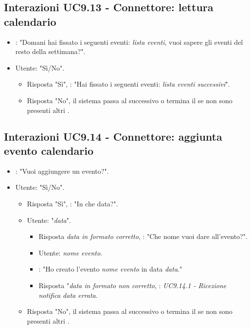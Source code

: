 \subsection{Interazioni UC9.13 - Connettore: lettura calendario}
\begin{itemize}
        \item {}: "Domani hai fissato i seguenti eventi: {\it lista eventi}, vuoi sapere gli eventi del resto della settimana?".
        \item Utente: "Sì/No".
        \begin{itemize}
         \item{Risposta "Sì"}, : "Hai fissato i seguenti eventi: {\it lista eventi successivi}".
         \item{Risposta "No"}, il sistema passa al  successivo o termina il  se non sono presenti altri .
         \end{itemize}
    \end{itemize}


\subsection{Interazioni UC9.14 - Connettore: aggiunta evento calendario}
 \begin{itemize}
        \item {}: "Vuoi aggiungere un evento?".
        \item Utente: "Sì/No".
        \begin{itemize}
         \item{Risposta "Sì"}, : "In che data?".
         \item Utente: "{\it data}".
         \begin{itemize}
             \item{Risposta {\it data in formato corretto}}, : "Che nome vuoi dare all'evento?".
             \item Utente: {\it nome evento}.
             \item {}: "Ho creato l'evento {\it nome evento} in data {\it data}."
            \item{Risposta "{\it data in formato non corretto}}, : {\it UC9.14.1 - Ricezione notifica data errata}.
         \end{itemize}
         \item{Risposta "No"}, il sistema passa al  successivo o termina il  se non sono presenti altri .
         \end{itemize}
    \end{itemize}

